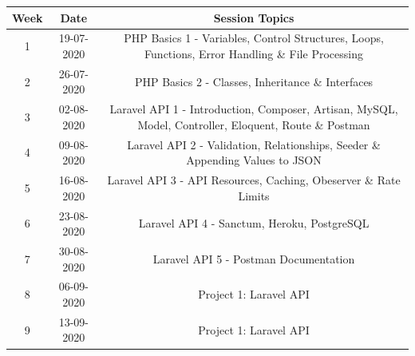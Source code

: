 \documentclass{article}
\begin{document}
\renewcommand{\arraystretch}{1.5}
\begin{tabular}{|c|c|c|c|}
	\hline
	\textbf{Week} & \textbf{Date}     & \multicolumn{2}{c|}{\textbf{Session Topics}}        \\ \hline
	\footnotesize 1      & \footnotesize 19-07-2020 & \multicolumn{2}{c|}{\footnotesize PHP Basics 1 - Variables, Control Structures, Loops, Functions, Error Handling \& File Processing} \\ \hline
	\footnotesize 2      & \footnotesize 26-07-2020 & \multicolumn{2}{c|}{\footnotesize PHP Basics 2 - Classes, Inheritance \& Interfaces} \\ \hline
	\footnotesize 3      & \footnotesize 02-08-2020 & \multicolumn{2}{c|}{\footnotesize Laravel API 1 - Introduction, Composer, Artisan, MySQL, Model, Controller, Eloquent, Route \& Postman} \\ \hline
	\footnotesize 4      & \footnotesize 09-08-2020 & \multicolumn{2}{c|}{\footnotesize Laravel API 2 - Validation, Relationships, Seeder \& Appending Values to JSON} \\ \hline
	\footnotesize 5      & \footnotesize 16-08-2020 & \multicolumn{2}{c|}{\footnotesize Laravel API 3 - API Resources, Caching, Obeserver \& Rate Limits} \\ \hline
	\footnotesize 6      & \footnotesize 23-08-2020 & \multicolumn{2}{c|}{\footnotesize Laravel API 4 - Sanctum, Heroku, PostgreSQL} \\ \hline
	\footnotesize 7      & \footnotesize 30-08-2020 & \multicolumn{2}{c|}{\footnotesize Laravel API 5 - Postman Documentation} \\ \hline
	\footnotesize 8      & \footnotesize 06-09-2020 & \multicolumn{2}{c|}{\footnotesize Project 1: Laravel API} \\ \hline
	\footnotesize 9      & \footnotesize 13-09-2020 & \multicolumn{2}{c|}{\footnotesize Project 1: Laravel API} \\ \hline


\end{tabular}
\end{document}
